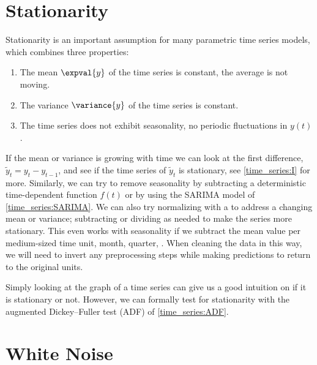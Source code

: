 \section{Stationarity}
\label{time_series:stationarity}

Stationarity is an important assumption for many parametric time series models,
which combines three properties:

\begin{enumerate}[noitemsep]
  \item The mean $\expval{y}$ of the time series is constant, \ie the average is not moving.\label{item:time_series:stationarity:constant_mean}
  \item The variance $\variance{y}$ of the time series is constant.\label{item:time_series:stationarity:constant_var}
  \item The time series does not exhibit seasonality, \ie no periodic fluctuations in $y\left(t\right)$.\label{item:time_series:stationarity:seasonality}
\end{enumerate}

If the mean or variance is growing with time
we can look at the first difference, $\widetilde{y}_{t} = y_{t} - y_{t-1}$,
and see if the time series of $\widetilde{y}_{t}$ is stationary,
see \cref{time_series:I} for more.
Similarly, we can try to remove seasonality
by subtracting a deterministic time-dependent function $f\left(t\right)$
or by using the SARIMA model of \cref{time_series:SARIMA}.
We can also try normalizing with a \Zscore to address a changing mean or variance;
subtracting or dividing as needed to make the series more stationary.
This even works with seasonality if we subtract the mean value per medium-sized time unit, \eg month, quarter, \etc.
When cleaning the data in this way,
we will need to invert any preprocessing steps
while making predictions to return to the original units.

Simply looking at the graph of a time series can give us
a good intuition on if it is stationary or not.
However, we can formally test for stationarity
with the augmented Dickey--Fuller test (ADF) of \cref{time_series:ADF}.

\section{White Noise}
\label{time_series:white_noise}

